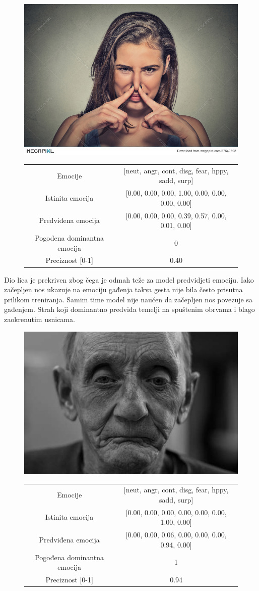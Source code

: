 \documentclass[times, utf8, zavrsni,numeric,pstricks]{fer}
\begin{document}
\begin{figure}[H]
\centering
		\includegraphics[width=0.3\linewidth, keepaspectratio]{139a57640598.png}
		\begin{tabular}
					{|c|c|}\hline
					Emocije & [neut, angr, cont, disg, fear, hppy, sadd, surp]\\
					Istinita emocija & [0.00, 0.00, 0.00, 1.00, 0.00, 0.00, 0.00, 0.00]\\
					Predviđena emocija	& [0.00, 0.00, 0.00, 0.39, 0.57, 0.00, 0.01, 0.00]\\								Pogođena dominantna emocija & 0\\
					Preciznost [0-1] & 0.40\\
					\hline
		\end{tabular}
\end{figure}


Dio lica je prekriven zbog čega je odmah teže za model predvidjeti emociju. Iako začepljen nos ukazuje na emociju gađenja takva gesta nije bila često prisutna prilikom treniranja. Samim time model nije naučen da začepljen nos povezuje sa gađenjem. Strah koji dominantno predviđa temelji na spuštenim obrvama i blago zaokrenutim usnicama.

\begin{figure}[H]
\centering
		\includegraphics[width=0.3\linewidth, keepaspectratio]{84apeople-man-making-sad-face-person-person-image.png}
		\begin{tabular}
					{|c|c|}\hline
					Emocije & [neut, angr, cont, disg, fear, hppy, sadd, surp]\\
					Istinita emocija & [0.00, 0.00, 0.00, 0.00, 0.00, 0.00, 1.00, 0.00]\\
					Predviđena emocija	& [0.00, 0.00, 0.06, 0.00, 0.00, 0.00, 0.94, 0.00]\\
					Pogođena dominantna emocija & 1\\
					Preciznost [0-1] & 0.94\\
					\hline
		\end{tabular}
\end{figure}
\end{document}
